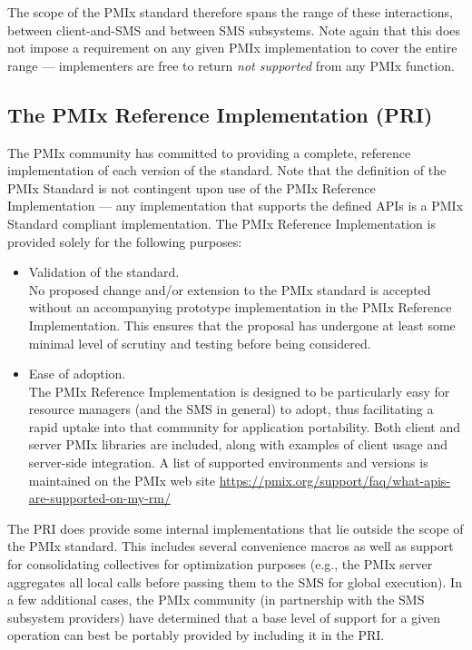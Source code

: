The scope of the PMIx standard therefore spans the range of these interactions, between client-and-SMS and between SMS
subsystems. Note again that this does not impose a requirement on any given PMIx implementation to cover the entire
range --- implementers are free to return \textit{not supported} from any PMIx function.


\subsection{The PMIx Reference Implementation (PRI)}

The \ac{PMIx} community has committed to providing a complete, reference implementation of each version of the standard. Note that the definition of the \ac{PMIx} Standard is not contingent upon use of the \ac{PMIx} Reference Implementation --- any implementation that supports the defined \acp{API} is a \ac{PMIx} Standard compliant implementation.
The \ac{PMIx} Reference Implementation is provided solely for the following purposes:
\begin{itemize}
\item Validation of the standard.\\
No proposed change and/or extension to the \ac{PMIx} standard is accepted without an accompanying prototype implementation in the \ac{PMIx} Reference Implementation.
This ensures that the proposal has undergone at least some minimal level of scrutiny and testing before being considered.
\item Ease of adoption.\\
The \ac{PMIx} Reference Implementation is designed to be particularly easy for resource managers (and the \ac{SMS} in general) to adopt, thus facilitating a rapid uptake into that community for application portability.
Both client and server \ac{PMIx} libraries are included, along with examples of client usage and server-side integration.
A list of supported environments and versions is maintained on the \ac{PMIx} web site \url{https://pmix.org/support/faq/what-apis-are-supported-on-my-rm/}
\end{itemize}

The \ac{PRI} does provide some internal implementations that lie outside the scope of the \ac{PMIx} standard. This includes several convenience macros as well as support for consolidating collectives for optimization purposes (e.g., the \ac{PMIx} server aggregates all local  calls before
passing them to the \ac{SMS} for global execution). In a few additional cases, the \ac{PMIx} community (in partnership with the \ac{SMS} subsystem providers) have determined that a base level of support for a given operation can best be portably provided by including it in the \ac{PRI}.

